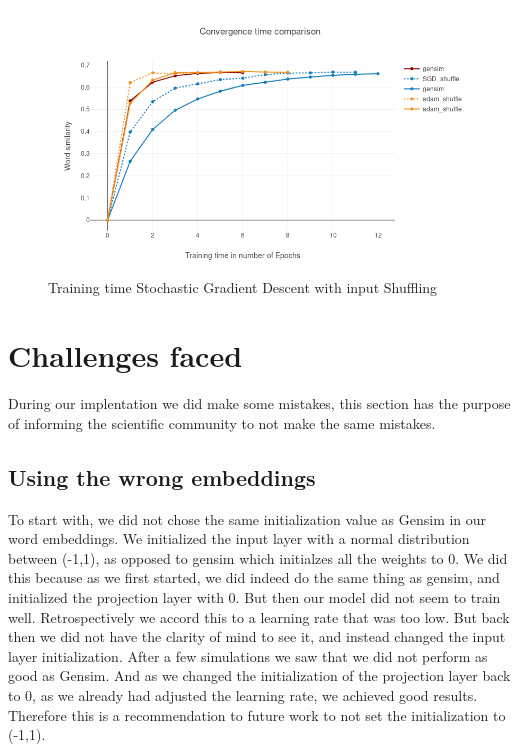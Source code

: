 \begin{figure}[H]
    \centering
			\includegraphics[scale=0.45]{images/gensim_vs_adam} 
    \caption{Training time Stochastic Gradient Descent with input Shuffling}
    \label{fig:gensim_vs_adam}
\end{figure}

\section{Challenges faced}
During our implentation we did make some mistakes, this section has the purpose of informing the scientific community to not make the same mistakes. 
\subsection{Using the wrong embeddings}
To start with, we did not chose the same initialization value as Gensim in our word embeddings. We initialized the input layer with a normal distribution between (-1,1), as opposed to gensim which initialzes all the weights to 0. We did this because as we first started, we did indeed do the same thing as gensim, and initialized the projection layer with 0. But then our model did not seem to train well. Retrospectively we accord this to a learning rate that was too low. But back  then we did not have the clarity of mind to see it, and instead changed the input layer initialization. After a few simulations we saw that we did not perform as good as Gensim. And as we changed the initialization of the projection layer back to 0, as we already had adjusted the learning rate, we achieved good results. Therefore this is a recommendation to future work to not set the initialization to (-1,1).


